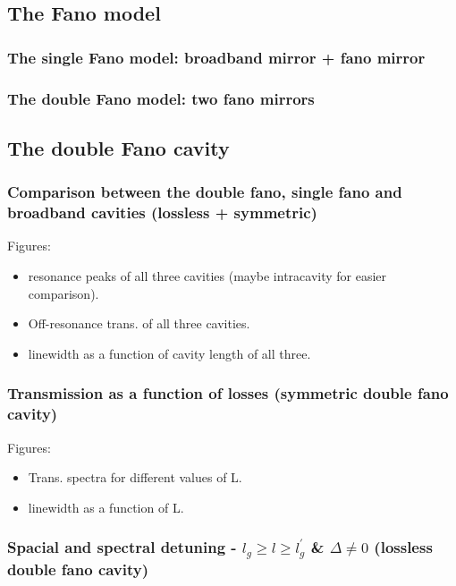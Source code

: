 \subsection{The Fano model}

\subsubsection{The single Fano model: broadband mirror + fano mirror}

\subsubsection{The double Fano model: two fano mirrors}

\subsection{The double Fano cavity}

\subsubsection{Comparison between the double fano, single fano and broadband cavities (lossless + symmetric)}

Figures:
\begin{itemize}
    \item resonance peaks of all three cavities (maybe intracavity for easier comparison).
    \item Off-resonance trans. of all three cavities.
    \item linewidth as a function of cavity length of all three.
\end{itemize}

\subsubsection{Transmission as a function of losses (symmetric double fano cavity)}

Figures:
\begin{itemize}
    \item Trans. spectra for different values of L.
    \item linewidth as a function of L.
\end{itemize}

\subsubsection{Spacial and spectral detuning - $l_{g} \geq l \geq l_{g}^{\prime}$ \& $\Delta \neq 0$ (lossless double fano cavity)}

